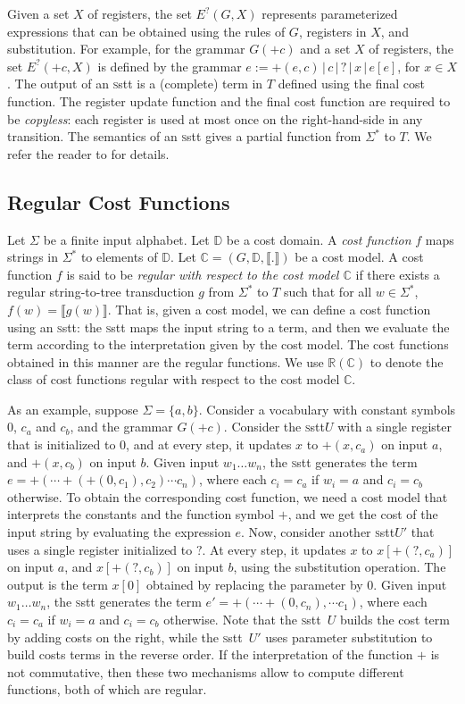 \documentclass[11pt]{article}
\newcommand{\mypar}[1]{\subsection{#1}}
\newcommand{\domain}{\ensuremath{\mathbb{D}}}
\def\hole{?}
\newcommand{\trees}{T}
\newcommand{\CG}{G}
\newcommand{\sep}{\ensuremath{\,|\,}}
\newcommand{\reg}[1]{{\mathbb R}(#1)}
\newcommand{\CostModel}{\ensuremath{\mathbb{C}}}
\newcommand{\SSTT}{{\sc\textsc sstt}\xspace}
\newcommand{\stt}{\ensuremath{U}}
\newcommand{\inputalph}{\ensuremath{\Sigma}}
\newcommand{\fm}[1]{\ensuremath{#1^{*}}}
\newcommand{\interp}[1]{\ensuremath{\llbracket #1\rrbracket}}
\newcommand{\edwavariables}{\ensuremath{X}}
\def\pexpr{E^\hole}
\begin{document}
Given a set $\edwavariables$ of registers, the set
$\pexpr(\CG,\edwavariables)$ represents parameterized expressions that
can be obtained using the rules of $\CG$, registers in
$\edwavariables$, and substitution.  For example, for the grammar
$\CG(+c)$ and a set $\edwavariables$ of registers, the set
$\pexpr(+c,\edwavariables)$ is defined by the grammar $e := +(e,c)\sep
c\sep \hole \sep x \sep e[e]$, for $x\in\edwavariables$.  The output
of an \SSTT  is a (complete) term in $\trees$ defined using the final
cost function.  The register update function and the final cost
function are required to be {\em copyless}: each register is used at
most once on the right-hand-side in any transition.  The semantics of
an \SSTT gives a partial function from $\fm\inputalph$ to $\trees$.
We refer the reader to \cite{alur_stt_2011} for details.

\mypar{Regular Cost Functions}\label{subsec:reg}
Let $\Sigma$ be a finite input alphabet.  Let $\domain$ be a cost
domain. A {\em cost function} $f$ maps strings in $\fm{\Sigma}$ to
elements of $\domain$. Let $\CostModel = (\CG, \domain, \interp{.})$
be a cost model.  A cost function $f$ is said to be {\em regular with
respect to the cost model $\CostModel$\/} if there exists a regular
string-to-tree transduction $g$ from $\fm\Sigma$ to $\trees$ such that
for all $w \in \fm{\Sigma}$, $f(w) = \interp{g(w)}$.  That is, given a
cost model, we can define a cost function using an \SSTT: the \SSTT
maps the input string to a term, and then we evaluate the term
according to the interpretation given by the cost model.  The cost
functions obtained in this manner are the regular functions.  We use
$\reg{\CostModel}$ to denote the class of cost functions regular with
respect to the cost model $\CostModel$.

As an example, suppose $\Sigma=\{a,b\}$.  Consider a vocabulary with
constant symbols $0$, $c_a$ and $c_b$, and the grammar $\CG(+c)$.
Consider the \SSTT $\stt$ with a single register that is initialized
to $0$, and at every step, it updates $x$ to $+(x,c_a)$ on input $a$,
and $+(x,c_b)$ on input $b$.  Given input $w_1\ldots w_n$, the \SSTT
generates the term $e=+(\cdots +(+(0,c_1),c_2)\cdots c_n)$, where each
$c_i=c_a$ if $w_i=a$ and $c_i=c_b$ otherwise.  To obtain the
corresponding cost function, we need a cost model that interprets the
constants and the function symbol $+$, and we get the cost of the
input string by evaluating the expression $e$.  Now, consider another
\SSTT $\stt'$ that uses a single register initialized to $\hole$.  At
every step, it updates $x$ to $x[+(\hole,c_a)]$ on input $a$, and
$x[+(\hole,c_b)]$ on input $b$, using the substitution operation.  The
output is the term $x[0]$ obtained by replacing the parameter by 0.
Given input $w_1\ldots w_n$, the \SSTT generates the term $e'=+(\cdots
+(0,c_n),\cdots c_1)$, where each $c_i=c_a$ if $w_i=a$ and $c_i=c_b$
otherwise.  Note that the \SSTT~$\stt$ builds the cost term by adding
costs on the right, while the \SSTT~$\stt'$ uses parameter
substitution to build costs terms in the reverse order.  If the
interpretation of the function $+$ is not commutative, then these two
mechanisms allow to compute different functions, both of which are
regular.
\end{document}
